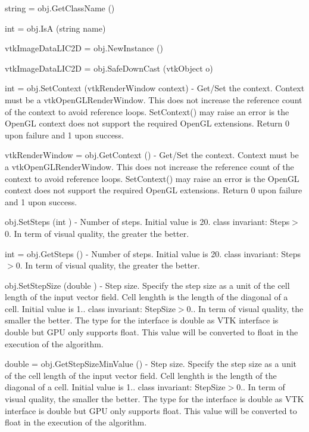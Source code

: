 \begin{DoxyItemize}
\item {\ttfamily string = obj.\-Get\-Class\-Name ()}  
\item {\ttfamily int = obj.\-Is\-A (string name)}  
\item {\ttfamily vtk\-Image\-Data\-L\-I\-C2\-D = obj.\-New\-Instance ()}  
\item {\ttfamily vtk\-Image\-Data\-L\-I\-C2\-D = obj.\-Safe\-Down\-Cast (vtk\-Object o)}  
\item {\ttfamily int = obj.\-Set\-Context (vtk\-Render\-Window context)} -\/ Get/\-Set the context. Context must be a vtk\-Open\-G\-L\-Render\-Window. This does not increase the reference count of the context to avoid reference loops. Set\-Context() may raise an error is the Open\-G\-L context does not support the required Open\-G\-L extensions. Return 0 upon failure and 1 upon success.  
\item {\ttfamily vtk\-Render\-Window = obj.\-Get\-Context ()} -\/ Get/\-Set the context. Context must be a vtk\-Open\-G\-L\-Render\-Window. This does not increase the reference count of the context to avoid reference loops. Set\-Context() may raise an error is the Open\-G\-L context does not support the required Open\-G\-L extensions. Return 0 upon failure and 1 upon success.  
\item {\ttfamily obj.\-Set\-Steps (int )} -\/ Number of steps. Initial value is 20. class invariant\-: Steps$>$0. In term of visual quality, the greater the better.  
\item {\ttfamily int = obj.\-Get\-Steps ()} -\/ Number of steps. Initial value is 20. class invariant\-: Steps$>$0. In term of visual quality, the greater the better.  
\item {\ttfamily obj.\-Set\-Step\-Size (double )} -\/ Step size. Specify the step size as a unit of the cell length of the input vector field. Cell lenghth is the length of the diagonal of a cell. Initial value is 1.. class invariant\-: Step\-Size$>$0.. In term of visual quality, the smaller the better. The type for the interface is double as V\-T\-K interface is double but G\-P\-U only supports float. This value will be converted to float in the execution of the algorithm.  
\item {\ttfamily double = obj.\-Get\-Step\-Size\-Min\-Value ()} -\/ Step size. Specify the step size as a unit of the cell length of the input vector field. Cell lenghth is the length of the diagonal of a cell. Initial value is 1.. class invariant\-: Step\-Size$>$0.. In term of visual quality, the smaller the better. The type for the interface is double as V\-T\-K interface is double but G\-P\-U only supports float. This value will be converted to float in the execution of the algorithm.  

\end{DoxyItemize}
